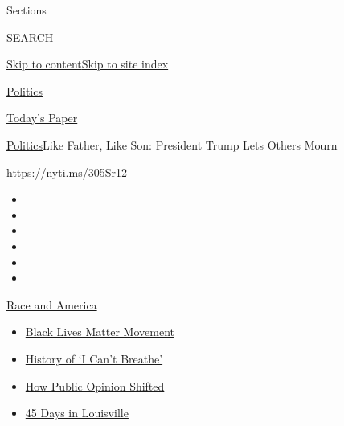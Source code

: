 Sections

SEARCH

\protect\hyperlink{site-content}{Skip to
content}\protect\hyperlink{site-index}{Skip to site index}

\href{https://www.nytimes3xbfgragh.onion/section/politics}{Politics}

\href{https://myaccount.nytimes3xbfgragh.onion/auth/login?response_type=cookie\&client_id=vi}{}

\href{https://www.nytimes3xbfgragh.onion/section/todayspaper}{Today's
Paper}

\href{/section/politics}{Politics}\textbar{}Like Father, Like Son:
President Trump Lets Others Mourn

\url{https://nyti.ms/305Sr12}

\begin{itemize}
\item
\item
\item
\item
\item
\item
\end{itemize}

\href{https://www.nytimes3xbfgragh.onion/news-event/george-floyd-protests-minneapolis-new-york-los-angeles?action=click\&pgtype=Article\&state=default\&region=TOP_BANNER\&context=storylines_menu}{Race
and America}

\begin{itemize}
\tightlist
\item
  \href{https://www.nytimes3xbfgragh.onion/interactive/2020/07/03/us/george-floyd-protests-crowd-size.html?action=click\&pgtype=Article\&state=default\&region=TOP_BANNER\&context=storylines_menu}{Black
  Lives Matter Movement}
\item
  \href{https://www.nytimes3xbfgragh.onion/interactive/2020/06/28/us/i-cant-breathe-police-arrest.html?action=click\&pgtype=Article\&state=default\&region=TOP_BANNER\&context=storylines_menu}{History
  of `I Can't Breathe'}
\item
  \href{https://www.nytimes3xbfgragh.onion/interactive/2020/06/10/upshot/black-lives-matter-attitudes.html?action=click\&pgtype=Article\&state=default\&region=TOP_BANNER\&context=storylines_menu}{How
  Public Opinion Shifted}
\item
  \href{https://www.nytimes3xbfgragh.onion/interactive/2020/07/16/us/black-lives-matter-protests-louisville-breonna-taylor.html?action=click\&pgtype=Article\&state=default\&region=TOP_BANNER\&context=storylines_menu}{45
  Days in Louisville}
\end{itemize}

